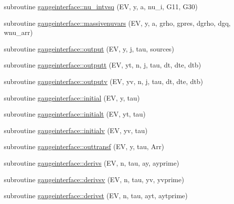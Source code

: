 \begin{DoxyCompactItemize}
\item 
subroutine \mbox{\hyperlink{namespacegaugeinterface_a2e8822823d298cb0912b5ec22ea4a6ff}{gaugeinterface\+::nu\+\_\+intvsq}} (EV, y, a, nu\+\_\+i, G11, G30)
\item 
subroutine \mbox{\hyperlink{namespacegaugeinterface_ae4228ed9cfb9382025eb84617b0ed091}{gaugeinterface\+::massivenuvars}} (EV, y, a, grho, gpres, dgrho, dgq, wnu\+\_\+arr)
\item 
subroutine \mbox{\hyperlink{namespacegaugeinterface_ac370c67bc9750bf5749a69531fe3ffc1}{gaugeinterface\+::output}} (EV, y, j, tau, sources)
\item 
subroutine \mbox{\hyperlink{namespacegaugeinterface_a5235d59ec77fa4b3a41d9754c8e447ca}{gaugeinterface\+::outputt}} (EV, yt, n, j, tau, dt, dte, dtb)
\item 
subroutine \mbox{\hyperlink{namespacegaugeinterface_ad9126befa5df67da981345f6230fede4}{gaugeinterface\+::outputv}} (EV, yv, n, j, tau, dt, dte, dtb)
\item 
subroutine \mbox{\hyperlink{namespacegaugeinterface_aa05aaad2bec1907778ea8eae3a7ba521}{gaugeinterface\+::initial}} (EV, y, tau)
\item 
subroutine \mbox{\hyperlink{namespacegaugeinterface_afbc0a211756e4b923725483b6c961e75}{gaugeinterface\+::initialt}} (EV, yt, tau)
\item 
subroutine \mbox{\hyperlink{namespacegaugeinterface_aeed464df3ecab21d57bcb789fe3b1a22}{gaugeinterface\+::initialv}} (EV, yv, tau)
\item 
subroutine \mbox{\hyperlink{namespacegaugeinterface_ae920635485c908177072c6cad0d49f59}{gaugeinterface\+::outtransf}} (EV, y, tau, Arr)
\item 
subroutine \mbox{\hyperlink{namespacegaugeinterface_a1d317261c83f3b5e84fe401ac2436d44}{gaugeinterface\+::derivs}} (EV, n, tau, ay, ayprime)
\item 
subroutine \mbox{\hyperlink{namespacegaugeinterface_a25ee0c9e055aabce6b7eb205e65f9804}{gaugeinterface\+::derivsv}} (EV, n, tau, yv, yvprime)
\item 
subroutine \mbox{\hyperlink{namespacegaugeinterface_ab2ff4cd74364457862a7ff44fb2ca978}{gaugeinterface\+::derivst}} (EV, n, tau, ayt, aytprime)
\end{DoxyCompactItemize}
